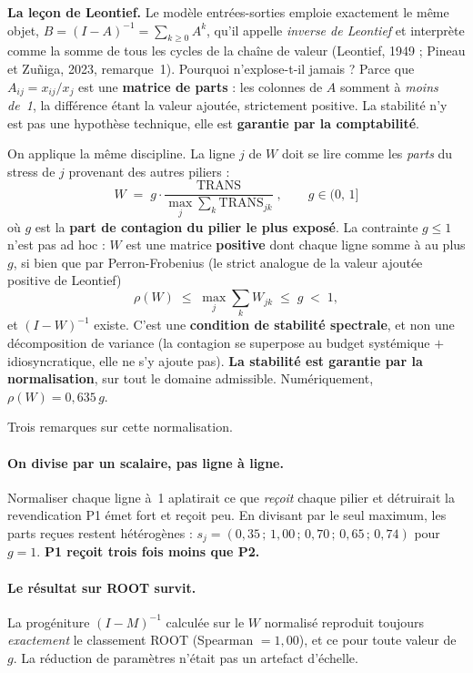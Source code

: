 \documentclass[11pt,a4paper]{article}
\begin{document}
\begin{cle}
\textbf{La leçon de Leontief.} Le modèle entrées-sorties emploie exactement le même objet,
$B = (I-A)^{-1} = \sum_{k\ge 0} A^k$, qu'il appelle \emph{inverse de Leontief} et interprète
comme la somme de tous les cycles de la chaîne de valeur (Leontief, 1949 ; Pineau et
Zu\~niga, 2023, remarque~1). Pourquoi n'explose-t-il jamais ? Parce que
$A_{ij} = x_{ij}/x_j$ est une \textbf{matrice de parts} : les colonnes de $A$ somment à
\emph{moins de~1}, la différence étant la valeur ajoutée, strictement positive. La stabilité
n'y est pas une hypothèse technique, elle est \textbf{garantie par la comptabilité}.

\smallskip
\noindent On applique la même discipline. La ligne $j$ de $W$ doit se lire comme les
\emph{parts} du stress de $j$ provenant des autres piliers :
\begin{equation}
\label{eq:norm}
\boxed{\;W \;=\; g \cdot \frac{\mathrm{TRANS}}{\max_j \sum_k \mathrm{TRANS}_{jk}}\;,
\qquad g \in (0,\,1]\;}
\end{equation}
où $g$ est la \textbf{part de contagion du pilier le plus exposé}. La contrainte $g\le 1$
n'est pas ad hoc : $W$ est une matrice \textbf{positive} dont chaque ligne somme à au plus $g$,
si bien que par Perron-Frobenius (le strict analogue de la valeur ajoutée positive de Leontief)
\[
\rho(W) \;\le\; \max_j \sum_k W_{jk} \;\le\; g \;<\; 1 ,
\]
et $(I-W)^{-1}$ existe. C'est une \textbf{condition de stabilité spectrale}, et non une
décomposition de variance (la contagion se superpose au budget systémique $+$ idiosyncratique,
elle ne s'y ajoute pas). \textbf{La stabilité est garantie par la normalisation}, sur tout le
domaine admissible. Numériquement, $\rho(W) = 0{,}635\,g$.
\end{cle}

\noindent Trois remarques sur cette normalisation.

\paragraph{On divise par un scalaire, pas ligne à ligne.} Normaliser chaque ligne à~1
aplatirait ce que \emph{reçoit} chaque pilier et détruirait la revendication \og{}P1 émet
fort et reçoit peu\fg{}. En divisant par le seul maximum, les parts reçues restent
hétérogènes : $s_j = (0{,}35\,;\,1{,}00\,;\,0{,}70\,;\,0{,}65\,;\,0{,}74)$ pour $g=1$.
\textbf{P1 reçoit trois fois moins que P2.}

\paragraph{Le résultat sur ROOT survit.} La progéniture $(I-M)^{-1}$ calculée sur le $W$
normalisé reproduit toujours \emph{exactement} le classement ROOT (Spearman $=1{,}00$), et
ce pour toute valeur de $g$. La réduction de paramètres n'était pas un artefact d'échelle.
\end{document}

